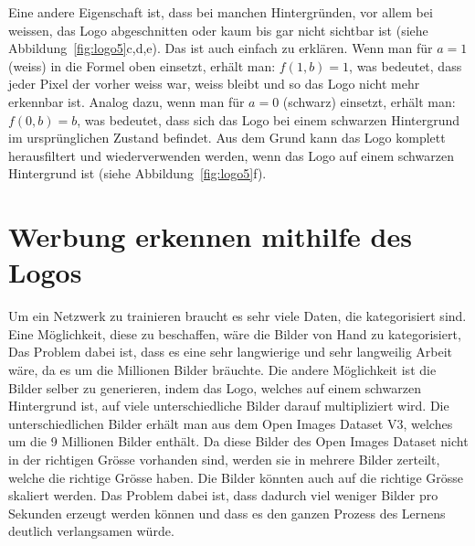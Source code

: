 \documentclass[12pt,a4paper]{report}
\begin{document}
Eine andere Eigenschaft ist, dass bei manchen Hintergründen,
vor allem bei weissen, das Logo abgeschnitten oder kaum bis gar nicht sichtbar ist (siehe Abbildung~\ref{fig:logo5}c,d,e).
Das ist auch einfach zu erklären.
Wenn man für $a = 1$ (weiss) in die Formel oben einsetzt, erhält man: $f(1, b) = 1$,
was bedeutet, dass jeder Pixel der vorher weiss war, weiss bleibt und so das Logo nicht mehr erkennbar ist.
Analog dazu, wenn man für $a = 0$ (schwarz) einsetzt, erhält man: $f(0, b) = b$, was bedeutet, dass sich das Logo bei einem schwarzen Hintergrund
im ursprünglichen Zustand befindet.
Aus dem Grund kann das Logo komplett herausfiltert und wiederverwenden werden, wenn das Logo auf einem schwarzen Hintergrund ist (siehe Abbildung~\ref{fig:logo5}f).

\section{Werbung erkennen mithilfe des Logos}
Um ein Netzwerk zu trainieren braucht es sehr viele Daten, die kategorisiert sind.
Eine Möglichkeit, diese zu beschaffen, wäre die Bilder von Hand zu kategorisiert,
Das Problem dabei ist, dass es eine sehr langwierige und sehr langweilig Arbeit wäre,
da es um die Millionen Bilder bräuchte.
Die andere Möglichkeit ist die Bilder selber zu generieren,
indem das Logo, welches auf einem schwarzen Hintergrund ist, auf viele unterschiedliche Bilder darauf multipliziert wird.
Die unterschiedlichen Bilder erhält man aus dem Open Images Dataset V3\cite{openimages}, welches um die 9 Millionen Bilder enthält.
Da diese Bilder des Open Images Dataset nicht in der richtigen Grösse vorhanden sind, werden sie in mehrere Bilder zerteilt, welche die richtige Grösse haben.
Die Bilder könnten auch auf die richtige Grösse skaliert werden.
Das Problem dabei ist, dass dadurch viel weniger Bilder pro Sekunden erzeugt werden können und dass es den ganzen Prozess des Lernens deutlich verlangsamen würde.
\end{document}

